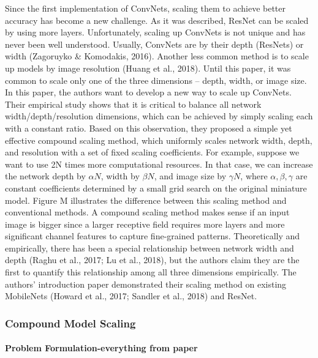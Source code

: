 \documentclass[
]{krantz}
\begin{document}
Since the first implementation of ConvNets, scaling them to achieve better accuracy has become a new challenge. As it was described, ResNet can be scaled by using more layers. Unfortunately, scaling up ConvNets is not unique and has never been well understood. Usually, ConvNets are by their depth (ResNets) or width (Zagoruyko \& Komodakis, 2016). Another less common method is to scale up models by image resolution (Huang et al., 2018). Until this paper, it was common to scale only one of the three dimensions -- depth, width, or image size.
In this paper, the authors want to develop a new way to scale up ConvNets. Their empirical study shows that it is critical to balance all network width/depth/resolution dimensions, which can be achieved by simply scaling each with a constant ratio. Based on this observation, they proposed a simple yet effective compound scaling method, which uniformly scales network width, depth, and resolution with a set of fixed scaling coefficients.
For example, suppose we want to use 2N times more computational resources. In that case, we can increase the network depth by \(\alpha N\), width by \(\beta N\), and image size by \(\gamma N\), where \(\alpha,\beta,\gamma\) are constant coefficients determined by a small grid search on the original miniature model. Figure M illustrates the difference between this scaling method and conventional methods.
A compound scaling method makes sense if an input image is bigger since a larger receptive field requires more layers and more significant channel features to capture fine-grained patterns. Theoretically and empirically, there has been a special relationship between network width and depth (Raghu et al., 2017; Lu et al., 2018), but the authors claim they are the first to quantify this relationship among all three dimensions empirically. The authors' introduction paper demonstrated their scaling method on existing MobileNets (Howard et al., 2017; Sandler et al., 2018) and ResNet.

\hypertarget{compound-model-scaling}{%
\subsubsection{Compound Model Scaling}\label{compound-model-scaling}}

\hypertarget{problem-formulation-everything-from-paper}{%
\paragraph{Problem Formulation-everything from paper}\label{problem-formulation-everything-from-paper}}
\end{document}
